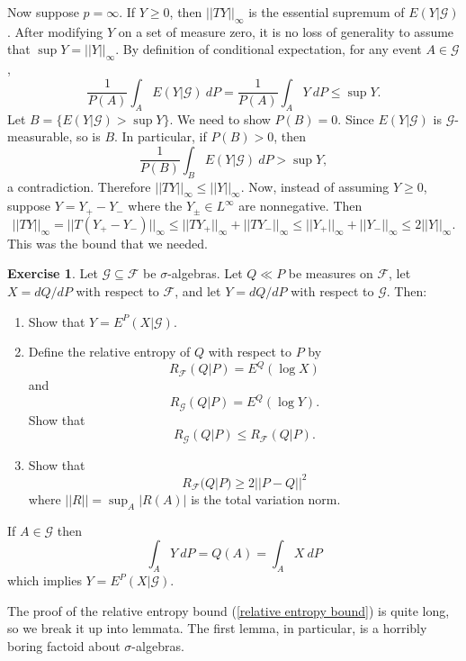 \documentclass[10pt]{article}
\theoremstyle{definition}
\newtheorem{exer}{Exercise}
\begin{document}
Now suppose $p = \infty$. If $Y \geq 0$, then $||TY||_\infty$ is the essential supremum of $E(Y|\mathcal G)$.
After modifying $Y$ on a set of measure zero, it is no loss of generality to assume that $\sup Y = ||Y||_\infty$.
By definition of conditional expectation, for any event $A \in \mathcal G$,
$$\frac{1}{P(A)} \int_A E(Y|\mathcal G) ~dP = \frac{1}{P(A)} \int_A Y~dP \leq \sup Y.$$
Let $B = \{E(Y|\mathcal G) > \sup Y\}$. We need to show $P(B) = 0$. Since $E(Y|\mathcal G)$ is $\mathcal G$-measurable, so is $B$.
In particular, if $P(B) > 0$, then
$$\frac{1}{P(B)} \int_B E(Y|\mathcal G) ~dP > \sup Y,$$
a contradiction.
Therefore $||TY||_\infty \leq ||Y||_\infty$.
Now, instead of assuming $Y \geq 0$, suppose $Y = Y_+ - Y_-$ where the $Y_\pm \in L^\infty$ are nonnegative. Then
$$||TY||_\infty = ||T(Y_+ - Y_-)||_\infty \leq ||TY_+||_\infty + ||TY_-||_\infty \leq ||Y_+||_\infty + ||Y_-||_\infty \leq 2||Y||_\infty.$$
This was the bound that we needed.

\begin{exer}
Let $\mathcal G \subseteq \mathcal F$ be $\sigma$-algebras.
Let $Q \ll P$ be measures on $\mathcal F$, let $X = dQ/dP$ with respect to $\mathcal F$, and let $Y = dQ/dP$ with respect to $\mathcal G$.
Then:
\begin{enumerate}
\item Show that $Y = E^P(X|\mathcal G)$.
\item Define the relative entropy of $Q$ with respect to $P$ by
$$R_{\mathcal F}(Q|P) = E^Q(\log X)$$
and
$$R_{\mathcal G}(Q|P) = E^Q(\log Y).$$ Show that
\begin{equation}
\label{relative entropy bound}
R_{\mathcal G}(Q|P) \leq R_{\mathcal F}(Q|P).
\end{equation}
\item Show that
\begin{equation}
\label{TV bound}
R_{\mathcal F}(Q|P) \geq 2||P - Q||^2
\end{equation}
where $||R|| = \sup_A |R(A)|$ is the total variation norm.
\end{enumerate}
\end{exer}

If $A \in \mathcal G$ then
$$\int_A Y~dP = Q(A) = \int_A X~dP$$
which implies $Y = E^P(X|\mathcal G)$.

The proof of the relative entropy bound (\ref{relative entropy bound}) is quite long, so we break it up into lemmata.
The first lemma, in particular, is a horribly boring factoid about $\sigma$-algebras.
\end{document}
